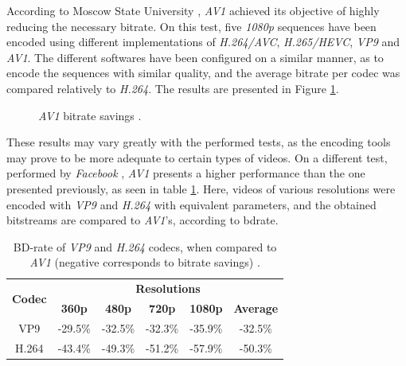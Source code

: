 According to Moscow State University \cite{vatolinMSUCodecComparison2019}, \emph{AV1} achieved its objective of highly reducing the necessary bitrate. On this test, five \emph{1080p} sequences have been encoded using different implementations of \emph{H.264/AVC}, \emph{H.265/HEVC}, \emph{VP9} and \emph{AV1}. The different softwares have been configured on a similar manner, as to encode the sequences with similar quality, and the average bitrate per codec was compared relatively to \emph{H.264}. The results are presented in Figure \ref{fig:testqual}.

\begin{figure}[!htbp]
    \centering
    
    \caption[\emph{AV1} bitrate savings]{\emph{AV1} bitrate savings \cite{vatolinMSUCodecComparison2019}.} 
    \label{fig:testqual}
\end{figure}

These results may vary greatly with the performed tests, as the encoding tools may prove to be more adequate to certain types of videos. On a different test, performed by \emph{Facebook} \cite{AV1BeatsX2642018}, \emph{AV1} presents a higher performance than the one presented previously, as seen in table \ref{tab:facetest}. Here, videos of various resolutions were encoded with \emph{VP9} and \emph{H.264} with equivalent parameters, and the obtained bitstreams are compared to \emph{AV1}'s, according to \gls{bdrate}.

\begin{table}[h]
    \centering
    \begin{tabular}{@{}cccccc@{}} \toprule
        \multirow{2}{*}{\textbf{Codec}}     &      \multicolumn{5}{c}{\textbf{Resolutions}} \\
         & \textbf{360p} & \textbf{480p} & \textbf{720p} & \textbf{1080p} & \textbf{Average}\\ \toprule 
        VP9            &    -29.5\% & -32.5\% & -32.3\% & -35.9\% & -32.5\% \\ \hline
        H.264          &    -43.4\% & -49.3\% & -51.2\% & -57.9\% & -50.3\% \\
        \bottomrule
    \end{tabular}
    \caption[BD-rate of \emph{VP9} and \emph{H.264} codecs, when compared to \emph{AV1} (negative corresponds to bitrate savings)]{BD-rate of \emph{VP9} and \emph{H.264} codecs, when compared to \emph{AV1} (negative corresponds to bitrate savings) \cite{AV1BeatsX2642018}.}
    \label{tab:facetest}
\end{table}

